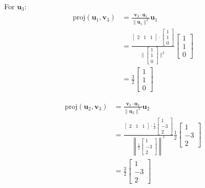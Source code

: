    For $\mathbf{u}_3$:
   \[
   \begin{aligned}
   \text{proj}(\mathbf{u}_1, \mathbf{v}_3) &= \frac{\mathbf{v}_3 \cdot \mathbf{u}_1}{\|\mathbf{u}_1\|^2} \mathbf{u}_1 \\
   &= \frac{\begin{bmatrix} 2 & 1 & 1 \end{bmatrix} \cdot \begin{bmatrix} 1 \\ 1 \\ 0 \end{bmatrix}}{\|\begin{bmatrix} 1 \\ 1 \\ 0 \end{bmatrix}\|^2} \begin{bmatrix} 1 \\ 1 \\ 0 \end{bmatrix} \\
   &= \frac{3}{2} \begin{bmatrix} 1 \\ 1 \\ 0 \end{bmatrix}
   \end{aligned}
   \]

   \[
   \begin{aligned}
   \text{proj}(\mathbf{u}_2, \mathbf{v}_3) &= \frac{\mathbf{v}_3 \cdot \mathbf{u}_2}{\|\mathbf{u}_2\|^2} \mathbf{u}_2 \\
   &= \frac{\begin{bmatrix} 2 & 1 & 1 \end{bmatrix} \cdot \frac{1}{2} \begin{bmatrix} 1 \\ -3 \\ 2 \end{bmatrix}}{\left\|\frac{1}{2} \begin{bmatrix} 1 \\ -3 \\ 2 \end{bmatrix}\right\|^2} \frac{1}{2} \begin{bmatrix} 1 \\ -3 \\ 2 \end{bmatrix} \\
   &= \frac{3}{2} \begin{bmatrix} 1 \\ -3 \\ 2 \end{bmatrix}
   \end{aligned}
   \]

